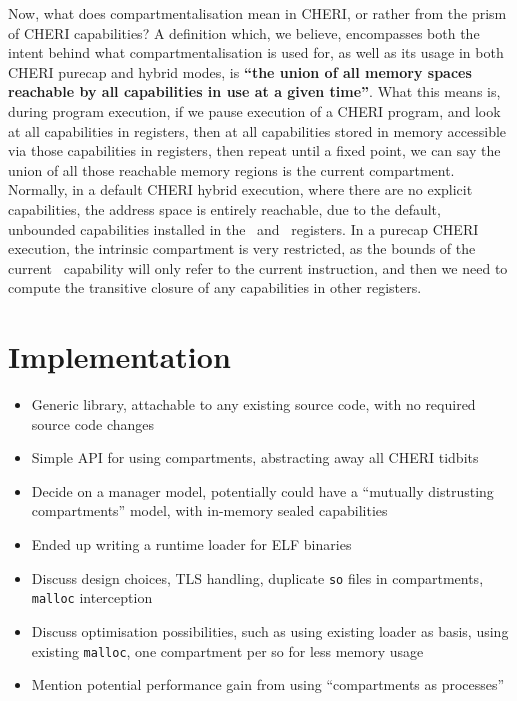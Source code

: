 Now, what does compartmentalisation mean in CHERI, or rather from the prism of
CHERI capabilities? A definition which, we believe, encompasses both the intent
behind what compartmentalisation is used for, as well as its usage in both
CHERI purecap and hybrid modes, is \textbf{``the union of all memory spaces
reachable by all capabilities in use at a given time''}. What this means is,
during program execution, if we pause execution of a CHERI program, and look at
all capabilities in registers, then at all capabilities stored in memory
accessible via those capabilities in registers, then repeat until a fixed
point, we can say the union of all those reachable memory regions is the
current compartment. Normally, in a default CHERI hybrid execution, where there
are no explicit capabilities, the address space is entirely reachable, due to
the default, unbounded capabilities installed in the \pcc~and \ddc~registers.
In a purecap CHERI execution, the intrinsic compartment is very restricted, as
the bounds of the current \pcc~capability will only refer to the current
instruction, and then we need to compute the transitive closure of any capabilities in other registers.

\section{Implementation}
\begin{itemize}
    \item Generic library, attachable to any existing source code, with no required source code changes
    \item Simple API for using compartments, abstracting away all CHERI tidbits
    \item Decide on a manager model, potentially could have a ``mutually distrusting compartments'' model, with in-memory sealed capabilities
    \item Ended up writing a runtime loader for ELF binaries
    \item Discuss design choices, TLS handling, duplicate \texttt{so} files in compartments, \texttt{malloc} interception
    \item Discuss optimisation possibilities, such as using existing loader as basis, using existing \texttt{malloc}, one compartment per so for less memory usage
    \item Mention potential performance gain from using ``compartments as processes''
\end{itemize}

